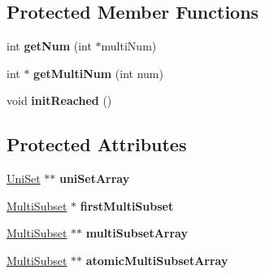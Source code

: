 \subsection*{Protected Member Functions}
\begin{DoxyCompactItemize}
\item 
\hypertarget{classMultiSet_a733d943fe9d2b3adea8a4bb428dead2f}{int {\bfseries get\-Num} (int $\ast$multi\-Num)}\label{classMultiSet_a733d943fe9d2b3adea8a4bb428dead2f}

\item 
\hypertarget{classMultiSet_a800300d40d19af10748df98a98fdd890}{int $\ast$ {\bfseries get\-Multi\-Num} (int num)}\label{classMultiSet_a800300d40d19af10748df98a98fdd890}

\item 
\hypertarget{classMultiSet_a75aafafabb07c7cc5f155fe18dded266}{void {\bfseries init\-Reached} ()}\label{classMultiSet_a75aafafabb07c7cc5f155fe18dded266}

\end{DoxyCompactItemize}
\subsection*{Protected Attributes}
\begin{DoxyCompactItemize}
\item 
\hypertarget{classMultiSet_ab52285f20752971019c8af0e7b8107f7}{\hyperlink{classUniSet}{Uni\-Set} $\ast$$\ast$ {\bfseries uni\-Set\-Array}}\label{classMultiSet_ab52285f20752971019c8af0e7b8107f7}

\item 
\hypertarget{classMultiSet_a18ee544d9b59a83e08eb8143432644ac}{\hyperlink{classMultiSubset}{Multi\-Subset} $\ast$ {\bfseries first\-Multi\-Subset}}\label{classMultiSet_a18ee544d9b59a83e08eb8143432644ac}

\item 
\hypertarget{classMultiSet_ab842b49495968659d979987e2d3285ef}{\hyperlink{classMultiSubset}{Multi\-Subset} $\ast$$\ast$ {\bfseries multi\-Subset\-Array}}\label{classMultiSet_ab842b49495968659d979987e2d3285ef}

\item 
\hypertarget{classMultiSet_a75fc7f1d1ee81e81456df4158c1c0a28}{\hyperlink{classMultiSubset}{Multi\-Subset} $\ast$$\ast$ {\bfseries atomic\-Multi\-Subset\-Array}}\label{classMultiSet_a75fc7f1d1ee81e81456df4158c1c0a28}

\end{DoxyCompactItemize}



